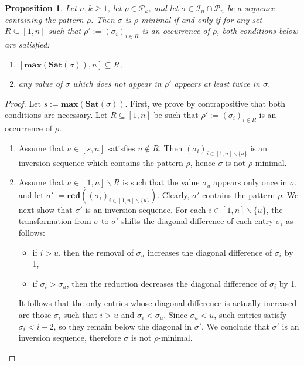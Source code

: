 \documentclass[a4paper,11pt]{article}
\newtheorem{prop}[thm]{Proposition}
\theoremstyle{definition}
\theoremstyle{remark}
\newcommand{\I}{\mathcal{I}}
\renewcommand{\P}{\mathcal{P}}
\renewcommand{\max}{\mathbf{max}}
\newcommand{\Sat}{\mathbf{Sat}}
\newcommand{\red}{\mathbf{red}}
\begin{document}
\begin{prop} \label{prop_minimal_characterization}
    Let $n,k \geq 1$, let $\rho \in \P_k$, and let $\sigma \in \I_n \cap \P_n$ be a sequence containing the pattern $\rho$. Then $\sigma$ is $\rho$-minimal if and only if for any set $R \subseteq [1,n]$ such that $\rho' := (\sigma_{i})_{i \in R}$ is an occurrence of $\rho$, both conditions below are satisfied:
    \begin{enumerate}
        \item $[\max(\Sat(\sigma)),n] \subseteq R$,
        \item any value of $\sigma$ which does not appear in $\rho'$ appears at least twice in $\sigma$.
    \end{enumerate}
\end{prop}
\begin{proof}
    Let $s := \max(\Sat(\sigma))$. First, we prove by contrapositive that both conditions are necessary. Let $R \subseteq [1,n]$ be such that $\rho' := (\sigma_{i})_{i \in R}$ is an occurrence of $\rho$.
    \begin{enumerate} 
        \item Assume that $u \in [s,n]$ satisfies $u \notin R$. Then $(\sigma_i)_{i \in [1,n] \backslash \{u\}}$ is an inversion sequence which contains the pattern $\rho$, hence $\sigma$ is not $\rho$-minimal.
        \item Assume that $u \in [1,n] \backslash R$ is such that the value $\sigma_u$ appears only once in $\sigma$, and let $ \sigma' := \red((\sigma_i)_{i \in [1,n] \backslash \{u\}})$. Clearly, $\sigma'$ contains the pattern $\rho$. We next show that $\sigma'$ is an inversion sequence. For each $i \in [1,n] \backslash \{u\}$, the transformation from $\sigma$ to $\sigma'$ shifts the diagonal difference of each entry $\sigma_i$ as follows:
        \begin{itemize}
            \item if $i > u$, then the removal of $\sigma_u$ increases the diagonal difference of $\sigma_i$ by 1,
            \item if $\sigma_i > \sigma_u$, then the reduction decreases the diagonal difference of $\sigma_i$ by 1.
        \end{itemize}
        It follows that the only entries whose diagonal difference is actually increased are those $\sigma_i$ such that $i > u$ and $\sigma_i <  \sigma_u$. Since $\sigma_u < u$, such entries satisfy $\sigma_i < i-2$, so they remain below the diagonal in $\sigma'$. We conclude that $\sigma'$ is an inversion sequence, therefore $\sigma$ is not $\rho$-minimal.

\end{enumerate}
\end{proof}
\end{document}
